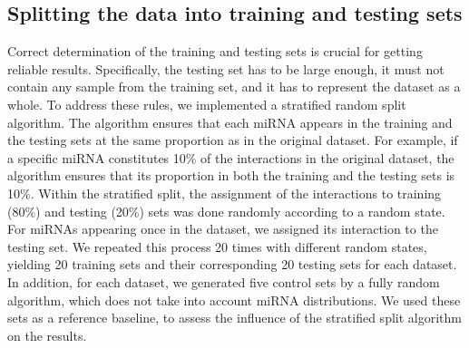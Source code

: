 \documentclass{bmcart}
\begin{document}
\subsection*{Splitting the data into training and testing sets} \label{method:split}
Correct determination of the training and testing sets is crucial for getting reliable results. Specifically, the testing set has to be large enough, it must not contain any sample from the training set, and it has to represent the dataset as a whole. 
To address these rules, we implemented a stratified random split algorithm. The algorithm ensures that each miRNA appears in the training and the testing sets at the same proportion as in the original dataset. For example, if a specific miRNA constitutes 10\% of the interactions in the original dataset, the algorithm ensures that its proportion in both the training and the testing sets is 10\%. Within the stratified split, the assignment of the interactions to training (80\%) and testing (20\%) sets was done randomly according to a random state. For miRNAs appearing once in the dataset, we assigned its interaction to the testing set.
We repeated this process 20 times with different random states, yielding 20 training sets and their corresponding 20 testing sets for each dataset. 
In addition, for each dataset, we generated five control sets by a fully random algorithm, which does not take into account miRNA distributions. We used these sets as a reference baseline, to assess the influence of the stratified split algorithm on the results.
\end{document}
